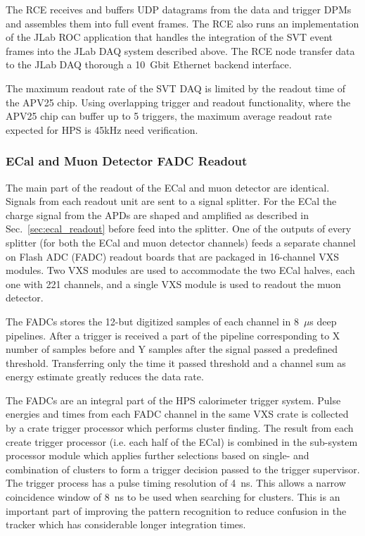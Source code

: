 The RCE receives and buffers UDP datagrams from the data and trigger DPMs and
 assembles them into full event frames. The RCE also runs an implementation of the JLab ROC application that handles the integration of the SVT event frames into the JLab DAQ 
 system described above. The RCE node transfer data to the JLab DAQ  
 thorough a 10~Gbit Ethernet backend interface. 


The maximum readout rate of the SVT DAQ  is limited by the readout time 
of the APV25 chip. Using overlapping trigger and readout functionality, where the 
APV25 chip can buffer up to 5 triggers, the maximum average readout rate expected for 
HPS is 45kHz {\color{red} need verification}.   







\subsubsection{ECal and Muon Detector FADC Readout}
\label{sec:ecal_daq}
The main part of the readout of the ECal and muon detector are identical. Signals from each 
readout unit are sent to a signal splitter. For the ECal the charge signal from the APDs are 
shaped and amplified as described in Sec.~\ref{sec:ecal_readout} before feed into the 
splitter. One of the outputs of every splitter (for both the ECal and muon detector channels) 
feeds a separate channel on Flash ADC (FADC) readout boards that are packaged in 
16-channel VXS modules. Two VXS modules are used to accommodate the two ECal 
halves, each one with 221 channels, and a single VXS module is used to readout the muon 
detector. 

The FADCs stores the 12-but digitized samples of each channel in 8~$\mu$s deep pipelines. 
After a trigger is received a part of the pipeline corresponding to X number of samples 
before and Y samples after the signal passed a predefined threshold. Transferring only 
the time it passed threshold and a channel sum as energy estimate greatly reduces the data rate. 


The FADCs are an integral part of the HPS calorimeter trigger system. Pulse energies 
and times from each FADC channel in the same VXS crate is collected by a crate trigger
 processor which performs cluster finding. The result from each create trigger processor (i.e. each half of 
the ECal) is combined in the sub-system processor module which applies further selections 
based on single- and combination of clusters to form a trigger decision passed to the trigger 
supervisor. The trigger process has a pulse timing resolution of 4~ns. This allows a narrow 
coincidence window of 8~ns to be used when searching for clusters. 
This is an important part of improving 
the pattern recognition to reduce confusion in the tracker which has considerable longer 
integration times. 


